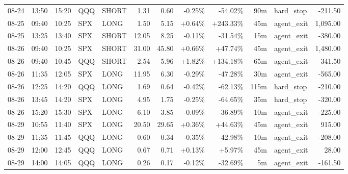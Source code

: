 \documentclass[11pt,a4paper,twoside]{article}
\begin{document}
\begin{center}
\begin{longtable}{>{\color{txtmain}}l l l l l r r r r r >{\color{txtmain}}l r}
08-24 & 13:50 & 15:20 & QQQ & SHORT & 1.31 & 0.60 & \textcolor{lossred}{-0.25\%} & \textcolor{lossred}{-54.02\%} & 90m & hard\_stop & \textcolor{lossred}{-211.50} \\
08-25 & 09:40 & 10:25 & SPX & LONG & 1.50 & 5.15 & \textcolor{wingreen}{+0.64\%} & \textcolor{wingreen}{+243.33\%} & 45m & agent\_exit & \textcolor{wingreen}{1,095.00} \\
08-25 & 13:25 & 13:40 & SPX & SHORT & 12.05 & 8.25 & \textcolor{lossred}{-0.11\%} & \textcolor{lossred}{-31.54\%} & 15m & agent\_exit & \textcolor{lossred}{-380.00} \\
08-26 & 09:40 & 10:25 & SPX & SHORT & 31.00 & 45.80 & \textcolor{wingreen}{+0.66\%} & \textcolor{wingreen}{+47.74\%} & 45m & agent\_exit & \textcolor{wingreen}{1,480.00} \\
08-26 & 09:40 & 10:45 & QQQ & SHORT & 2.54 & 5.96 & \textcolor{wingreen}{+1.82\%} & \textcolor{wingreen}{+134.18\%} & 65m & agent\_exit & \textcolor{wingreen}{341.50} \\
08-26 & 11:35 & 12:05 & SPX & LONG & 11.95 & 6.30 & \textcolor{lossred}{-0.29\%} & \textcolor{lossred}{-47.28\%} & 30m & agent\_exit & \textcolor{lossred}{-565.00} \\
08-26 & 12:25 & 14:20 & QQQ & LONG & 1.69 & 0.64 & \textcolor{lossred}{-0.42\%} & \textcolor{lossred}{-62.13\%} & 115m & hard\_stop & \textcolor{lossred}{-210.00} \\
08-26 & 13:45 & 14:20 & SPX & LONG & 4.95 & 1.75 & \textcolor{lossred}{-0.25\%} & \textcolor{lossred}{-64.65\%} & 35m & hard\_stop & \textcolor{lossred}{-320.00} \\
08-26 & 15:20 & 15:30 & SPX & LONG & 6.10 & 3.85 & \textcolor{lossred}{-0.09\%} & \textcolor{lossred}{-36.89\%} & 10m & agent\_exit & \textcolor{lossred}{-225.00} \\
08-29 & 10:55 & 11:40 & SPX & LONG & 20.50 & 29.65 & \textcolor{wingreen}{+0.36\%} & \textcolor{wingreen}{+44.63\%} & 45m & agent\_exit & \textcolor{wingreen}{915.00} \\
08-29 & 11:35 & 11:45 & QQQ & LONG & 0.60 & 0.34 & \textcolor{lossred}{-0.35\%} & \textcolor{lossred}{-42.98\%} & 10m & agent\_exit & \textcolor{lossred}{-208.00} \\
08-29 & 12:00 & 12:45 & QQQ & LONG & 0.67 & 0.71 & \textcolor{wingreen}{+0.13\%} & \textcolor{wingreen}{+5.97\%} & 45m & agent\_exit & \textcolor{wingreen}{28.00} \\
08-29 & 14:00 & 14:05 & QQQ & LONG & 0.26 & 0.17 & \textcolor{lossred}{-0.12\%} & \textcolor{lossred}{-32.69\%} & 5m & agent\_exit & \textcolor{lossred}{-161.50} \\

\end{longtable}
\end{center}
\end{document}

